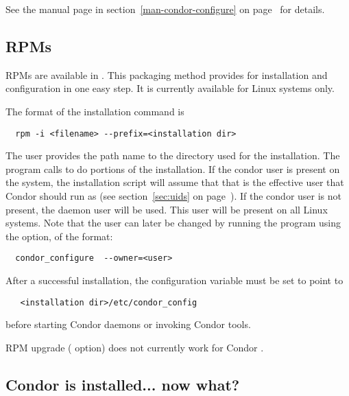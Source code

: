 See the  manual page in
section~\ref{man-condor-configure} on
page~\pageref{man-condor-configure} for details.

\subsection{\label{sec:install-rpms} RPMs}

RPMs are available in \VersionNotice.
This packaging method provides for installation and configuration
in one easy step.
It is currently available for Linux systems only.

The format of the installation command is
\begin{verbatim}
  rpm -i <filename> --prefix=<installation dir>
\end{verbatim}

The user provides the path name to the directory
used for the installation.
The  program calls  to do portions
of the installation.
If the condor user is present on the system,
the installation script will
assume that that is the effective user that Condor should run as
(see 
section~\ref{sec:uids} on
page~\pageref{sec:uids}).
If the condor user is not present,
the daemon user 
will be used.
This user will be present on all Linux systems. 
Note that the user can later be changed by running the 
program using the  option, of the format:
\begin{verbatim}
  condor_configure  --owner=<user>
\end{verbatim}

After a successful installation,
the  configuration 
variable must be set to point to
\begin{verbatim}
   <installation dir>/etc/condor_config
\end{verbatim}
before starting Condor daemons or invoking Condor tools.

RPM upgrade ( option) does not currently
work for Condor \VersionNotice.

\subsection{\label{installed-now-what}
Condor is installed... now what?}

